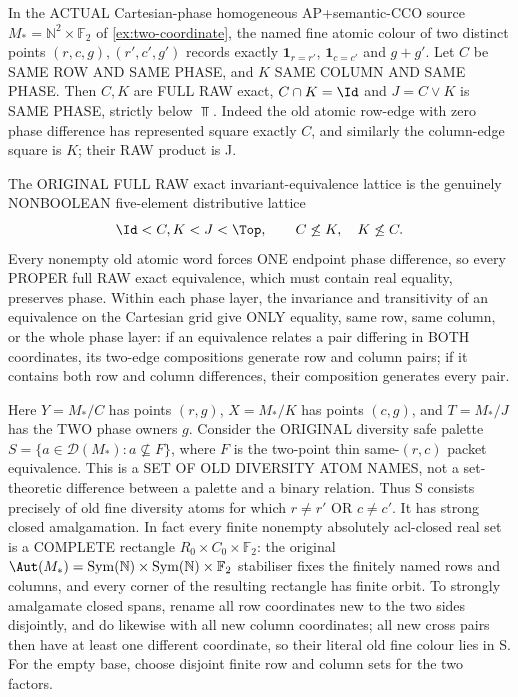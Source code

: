 \begin{example}
\label{ex:acf-nonboolean-phase-safety}
In the ACTUAL Cartesian-phase
homogeneous AP+semantic-CCO
source $M_*=\mathbb N^2\times\mathbb F_2$
of \cref{ex:two-coordinate},
the named fine atomic colour
of two distinct points
$(r,c,g),(r',c',g')$
records exactly
$\mathbf 1_{r=r'}$,
$\mathbf 1_{c=c'}$
and $g+g'$.
Let $C$ be SAME ROW AND
SAME PHASE, and $K$ SAME
COLUMN AND SAME PHASE.
Then $C,K$ are FULL RAW exact,
$C\cap K=\Id$ and
$J=C\vee K$ is SAME PHASE,
strictly below $\Top$.
Indeed the old atomic row-edge
with zero phase difference
has represented square
exactly $C$, and similarly
the column-edge square is
$K$; their RAW product is J.

The ORIGINAL FULL RAW exact
invariant-equivalence lattice
is the genuinely NONBOOLEAN
five-element distributive
lattice
\[
          \Id<C,K<J<\Top,
 \qquad C\not\le K,\quad
        K\not\le C.
\]
Every nonempty old atomic
word forces ONE endpoint
phase difference, so every
PROPER full RAW exact
equivalence, which must
contain real equality,
preserves phase.
Within each phase layer,
the invariance and
transitivity of an
equivalence on the
Cartesian grid give
ONLY equality, same row,
same column, or the
whole phase layer:
if an equivalence relates
a pair differing in BOTH
coordinates, its
two-edge compositions
generate row and column
pairs; if it contains
both row and column
differences, their
composition generates
every pair.

Here $Y=M_*/C$ has
points $(r,g)$,
$X=M_*/K$ has
points $(c,g)$, and
$T=M_*/J$ has the
TWO phase owners $g$.
Consider the ORIGINAL
diversity safe palette
$S=\{a\in\mathcal D(M_*):
                       a\not\subseteq F\}$,
where $F$ is the
two-point thin
same-$(r,c)$ packet
equivalence. This is
a SET OF OLD DIVERSITY
ATOM NAMES, not a
set-theoretic difference
between a palette and a
binary relation. Thus
S consists precisely
of old fine diversity
atoms for which
$r\ne r'$ OR $c\ne c'$.
It has strong closed
amalgamation. In fact
every finite nonempty
absolutely acl-closed
real set is a COMPLETE
rectangle $R_0\times
C_0\times\mathbb F_2$:
the original
\(\Aut(M_*)=
 \operatorname{Sym}(\mathbb N)
 \times\operatorname{Sym}(\mathbb N)
 \times\mathbb F_2\)
stabiliser fixes the
finitely named rows and
columns, and every
corner of the resulting
rectangle has finite
orbit. To strongly
amalgamate closed spans,
rename all row coordinates
new to the two sides
disjointly, and do
likewise with all new
column coordinates;
all new cross pairs
then have at least
one different coordinate,
so their literal old
fine colour lies in S.
For the empty base,
choose disjoint finite
row and column sets
for the two factors.


\end{example}
